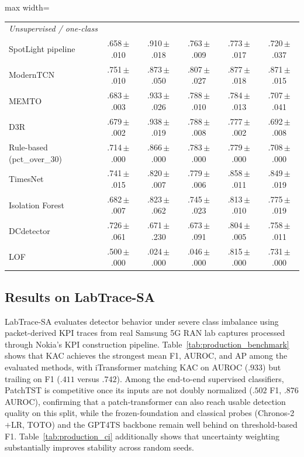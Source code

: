 \documentclass[conference]{IEEEtran}
\newcommand{\sd}[1]{\,{\fontsize{6pt}{7pt}\selectfont $\pm$#1}}
\begin{document}
\begin{table}[t]
\begin{adjustbox}{max width=\columnwidth}
\begin{tabular}{@{}lccccc@{}}
    \midrule
    \multicolumn{6}{l}{\emph{Unsupervised / one-class}} \\
    SpotLight pipeline & .658\sd{.010} & .910\sd{.018} & .763\sd{.009} & .773\sd{.017} & .720\sd{.037} \\
    ModernTCN~\cite{luo2024moderntcn}    & .751\sd{.010} & .873\sd{.050} & .807\sd{.027} & .877\sd{.018} & .871\sd{.015} \\
    MEMTO~\cite{song2023memto}           & .683\sd{.003} & .933\sd{.026} & .788\sd{.010} & .784\sd{.013} & .707\sd{.041} \\
    D3R~\cite{wang2023d3r}               & .679\sd{.002} & .938\sd{.019} & .788\sd{.008} & .777\sd{.002} & .692\sd{.008} \\
    Rule-based (pct\_over\_30)           & .714\sd{.000} & .866\sd{.000} & .783\sd{.000} & .779\sd{.000} & .708\sd{.000} \\
    TimesNet~\cite{wu2023timesnet}       & .741\sd{.015} & .820\sd{.007} & .779\sd{.006} & .858\sd{.011} & .849\sd{.019} \\
    Isolation Forest                     & .682\sd{.007} & .823\sd{.062} & .745\sd{.023} & .813\sd{.010} & .775\sd{.019} \\
    DCdetector~\cite{yang2023dcdetector} & .726\sd{.061} & .671\sd{.230} & .673\sd{.091} & .804\sd{.005} & .758\sd{.011} \\
    LOF                          & .500\sd{.000} & .024\sd{.000} & .046\sd{.000} & .815\sd{.000} & .731\sd{.000} \\
    \bottomrule
  \end{tabular}
  \end{adjustbox}
\end{table}

\subsection{Results on LabTrace-SA}
\label{sec:res_production}

LabTrace-SA evaluates detector behavior under severe class imbalance using packet-derived KPI traces from real Samsung 5G RAN lab captures processed through Nokia's KPI construction pipeline. Table~\ref{tab:production_benchmark} shows that KAC achieves the strongest mean F1, AUROC, and AP among the evaluated methods, with iTransformer matching KAC on AUROC ($.933$) but trailing on F1 ($.411$ versus $.742$). Among the end-to-end supervised classifiers, PatchTST is competitive once its inputs are not doubly normalized ($.502$ F1, $.876$ AUROC), confirming that a patch-transformer can also reach usable detection quality on this split, while the frozen-foundation and classical probes (Chronos-2$+$LR, TOTO) and the GPT4TS backbone remain well behind on threshold-based F1. Table~\ref{tab:production_ci} additionally shows that uncertainty weighting substantially improves stability across random seeds.
\end{document}
